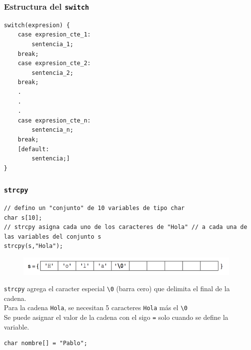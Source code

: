 \documentclass[handout]{beamer}
\begin{document}
\begin{frame}[t,fragile]\frametitle{Estructura del \texttt{switch}}
    
\begin{lstlisting}
switch(expresion) {
    case expresion_cte_1:
        sentencia_1;
    break;
    case expresion_cte_2:
        sentencia_2;
    break;
    .
    .
    .
    case expresion_cte_n:
        sentencia_n; 
    break;
    [default: 
        sentencia;]
}
\end{lstlisting}
\end{frame}

\begin{frame}[t,fragile]\frametitle{\texttt{strcpy}}
    
\begin{lstlisting}
// defino un "conjunto" de 10 variables de tipo char
char s[10];
// strcpy asigna cada uno de los caracteres de "Hola" // a cada una de las variables del conjunto s 
strcpy(s,"Hola"); 
\end{lstlisting}
\begin{figure}[tb]
    \centering
    \includegraphics[scale=.6]{./img/strcpy}
\end{figure}

\texttt{strcpy} agrega el caracter especial \texttt{\textbackslash{0}} (barra cero) que delimita el final de la cadena.\\
Para la cadena \texttt{Hola}, se necesitan 5 caracteres \texttt{Hola} más el \texttt{\textbackslash{0}}\\
Se puede asignar el valor de la cadena con el sigo \texttt{=} solo cuando se define la variable.
\begin{lstlisting}
char nombre[] = "Pablo"; 
\end{lstlisting}
\end{frame}
\end{document}

